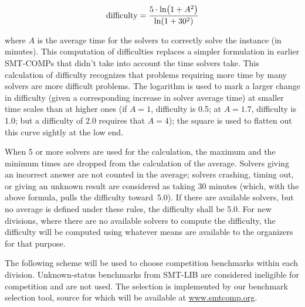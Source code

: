 \documentclass[12pt]{article}
\begin{document}
\[\mathrm{difficulty} = {5\cdot\ln\!\left(1+A^2\right) \over \ln\!\left(1+30^2\right)}\]

\noindent
where $A$ is the average time for the solvers to correctly solve the
instance (in minutes).  This computation of difficulties
replaces a simpler formulation in earlier SMT-COMPs that didn't take
into account the time solvers take.  This calculation of difficulty
recognizes that problems requiring more time by many solvers are
more difficult problems.  The logarithm is used to
mark a larger change in difficulty (given a corresponding increase in
solver average time) at smaller time scales than at higher ones (if $A=1$,
difficulty is 0.5; at $A=1.7$, difficulty is 1.0; but a difficulty of 2.0
requires that $A=4$); the square is used to flatten out this curve sightly
at the low end.  

When 5 or more solvers are used for the
calculation, the maximum and the minimum times are dropped from the calculation of the average.  Solvers giving an
incorrect answer are not counted in the average; solvers crashing,
timing out, or giving an unknown result are considered as taking 30
minutes (which, with the above formula, pulls the difficulty
toward~5.0).  If there are available solvers, but no average is
defined under these rules, the difficulty shall be 5.0.  For new
divisions, where there are no available solvers to compute the
difficulty, the difficulty will be computed using whatever means are
available to the organizers for that purpose.

The following scheme will be used to choose competition benchmarks
within each division.  Unknown-status benchmarks from SMT-LIB are
considered ineligible for competition and are not used.
%
The selection
is implemented by our benchmark selection tool, source for which will
be available at \url{www.smtcomp.org}.
\end{document}
